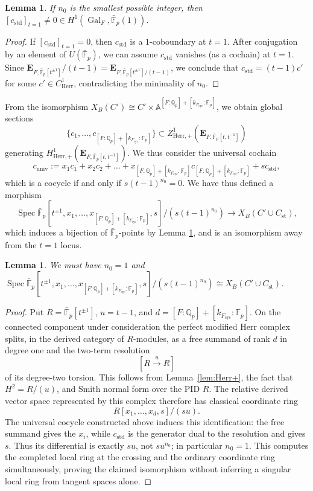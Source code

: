 \documentclass[11pt]{amsart}
\newcommand{\MAJOREDIT}[1]{{\color{revisiongreen}#1}}
\newtheorem{lem}[thm]{Lemma}
\theoremstyle{definition}
\newcommand{\Q}{\mathbb{Q}}
\newcommand{\F}{\mathbb{F}}
\newcommand{\A}{\mathbb{A}}
\newcommand{\bfE}{\mathbf{E}}
\newcommand{\bFp}{\bar{\mathbb{F}}_p}
\newcommand{\univ}{{\operatorname{univ}}}
\newcommand{\cyc}{{\operatorname{cyc}}}
\newcommand{\dkF}{[k_{F_{\cyc}}:\F_p]}
\newcommand{\dF}{[F:\Q_p]}
\DeclareMathOperator{\std}{std}
\DeclareMathOperator{\Spec}{Spec}
\DeclareMathOperator{\Gal}{Gal}
\DeclareMathOperator{\st}{st}
\newcommand{\Herr}{\mathrm{Herr}}
\begin{document}
\begin{lem}
If $n_0$ is the smallest possible integer,
then
$[c_{\std}]_{t=1}\neq 0\in H^1(\Gal_F, \bFp(1))$.
\label{lem:bstd}
\end{lem}

\begin{proof}
If $[c_{\std}]_{t=1}=0$,
then $c_{\std}$ is a $1$-coboundary  at $t=1$.
After conjugation by an element of
$U(\bFp)$,
we can assume $c_{\std}$ vanishes (as a cochain) at $t=1$.
Since
$\bfE_{F, \bFp[t^{\pm1}]}/(t-1)
=\bfE_{F, \bFp[t^{\pm1}]/(t-1)}$,
we conclude that
$c_{\std}=(t-1)c'$
for some $c'\in C^1_{\Herr}$,
contradicting the minimality of $n_0$.
\end{proof}

From the isomorphism
$X_B(C')\cong C'\times \A^{\dF+\dkF}$,
we obtain global sections
\[
\{c_1,\dots,c_{\dF+\dkF}\}\subset
Z^1_{\Herr,+}(\bfE_{F,\bFp[t,t^{-1}]})
\]
generating $H^1_{\Herr,+}(\bfE_{F,\bFp[t,t^{-1}]})$.
We thus
consider the universal cochain
\[
c_{\univ}:=
x_1 c_1 + x_2c_2+\dots+x_{\dF+\dkF}c_{\dF+\dkF}
+ s c_{\std},
\]
which is a cocycle if and only if
$s(t-1)^{n_0}=0$.
We have thus defined a morphism
\[
\Spec \bFp[t^{\pm1},x_1,\dots,x_{\dF+\dkF},s]/(s(t-1)^{n_0})
\to X_B(C'\cup C_{\st}),
\]
which induces a bijection of $\bFp$-points
by Lemma \ref{lem:bstd},
and is an isomorphism away from the $t=1$ locus.

\begin{lem}
We must have $n_0=1$
and 
$\Spec \bFp[t^{\pm1},x_1,\dots,x_{\dF+\dkF},s]/(s(t-1)^{n_0})
\cong X_B(C'\cup C_{\st})$.
\label{lem:PGL2-local}
\end{lem}

\begin{proof}
Put $R={\bFp}[t^{\pm1}]$, $u=t-1$, and
$d=\dF+\dkF$.  
\MAJOREDIT{On the connected component under consideration the perfect
modified Herr complex splits, in the derived category of $R$-modules, as a
free summand of rank $d$ in degree one and the two-term resolution
\[
 [R\xrightarrow{u}R]
\]
of its degree-two torsion.  This follows from Lemma~\ref{lem:Herr+}, the fact
that $H^2=R/(u)$, and Smith normal form over the PID $R$.  The relative
derived vector space represented by this complex therefore has classical
coordinate ring
\[
 R[x_1,\ldots,x_d,s]/(su).
\]
The universal cocycle constructed above induces this identification: the free
summand gives the $x_i$, while $c_{\std}$ is the generator dual to the
resolution and gives $s$.  Thus its differential is exactly $su$, not
$su^{n_0}$; in particular $n_0=1$.  This computes the completed local ring at
the crossing and the ordinary coordinate ring simultaneously, proving the
claimed isomorphism without inferring a singular local ring from tangent
    spaces alone.}
\end{proof}
\end{document}
